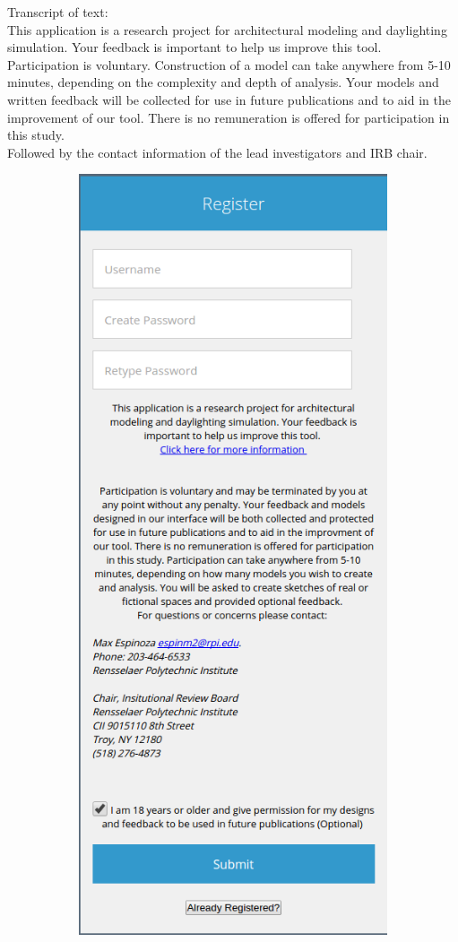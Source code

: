 \documentclass[12pt]{article}
\begin{document}
\noindent Transcript of text:\\
This application is a research project for architectural modeling and daylighting simulation. Your feedback is important to help us improve this tool. \\
Participation is voluntary. Construction of a model can take anywhere from 5-10 minutes, depending on the complexity and depth of analysis. Your models and written feedback will be collected for use in future publications and to aid in the improvement of our tool. There is no remuneration is offered for participation in this study. \\
Followed by the contact information of the lead investigators and IRB chair.

\begin{figure}[h]
  \begin{subfigure}{.5\textwidth}
    \centering
    \includegraphics[scale=0.4]{ss_reg}

\end{subfigure}
\end{figure}
\end{document}
